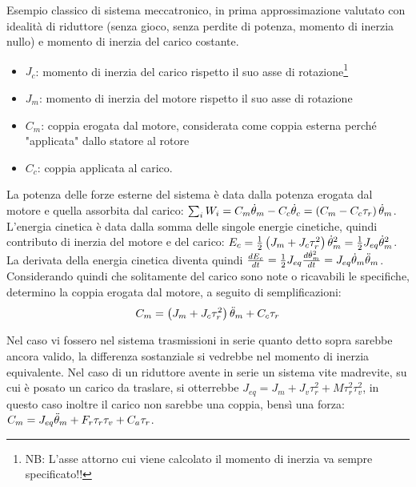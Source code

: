 Esempio classico di sistema meccatronico, in prima approssimazione valutato con idealità di riduttore (senza gioco, senza perdite di potenza, momento di inerzia nullo) e momento di inerzia del carico costante.


\begin{itemize}
    \item $J_c$: momento di inerzia del carico rispetto il suo asse di rotazione\footnote{NB: L'asse attorno cui viene calcolato il momento di inerzia va sempre specificato!!}
    \item $J_m$: momento di inerzia del motore rispetto il suo asse di rotazione
    \item $C_m$: coppia erogata dal motore, considerata come coppia esterna perché "applicata" dallo statore al rotore
    \item $C_c$: coppia applicata al carico.
\end{itemize}

La potenza delle forze esterne del sistema è data dalla potenza erogata dal motore e quella assorbita dal carico: $\sum_i W_i=C_m \dot{\theta}_m -C_c \dot{\theta}_c=\left(C_m -C_c \tau_r\right)\dot{\theta}_m$. L'energia cinetica è data dalla somma delle singole energie cinetiche, quindi contributo di inerzia del motore e del carico: $E_c=\frac{1}{2} \left(J_m + J_c\tau_r^2 \right)\dot{\theta}_m^2=\frac{1}{2} J_{eq} \dot{\theta}_m^2$.
La derivata della energia cinetica diventa quindi $\frac{dE_c}{dt}=\frac{1}{2} J_{eq}\frac{d\dot{\theta}_m^2}{dt}=J_{eq}\dot{\theta}_m \Ddot{\theta}_m$.
Considerando quindi che solitamente del carico sono note o ricavabili le specifiche, determino la coppia erogata dal motore, a seguito di semplificazioni: \[C_m=\left(J_m+J_c\tau_r^2\right)\Ddot{\theta}_m+C_c\tau_r\]

Nel caso vi fossero nel sistema trasmissioni in serie quanto detto sopra sarebbe ancora valido, la differenza sostanziale si vedrebbe nel momento di inerzia equivalente.
Nel caso di un riduttore avente in serie un sistema vite madrevite, su cui è posato un carico da traslare, si otterrebbe $J_{eq}=J_m+J_v \tau^2_r + M \tau_r^2 \tau_v^2$, in questo caso inoltre il carico non sarebbe una coppia, bensì una forza: $C_m=J_{eq}\Ddot{\theta}_m + F_r \tau_r \tau_v + C_a \tau_r$. \label{TrasmissioneSerie}

